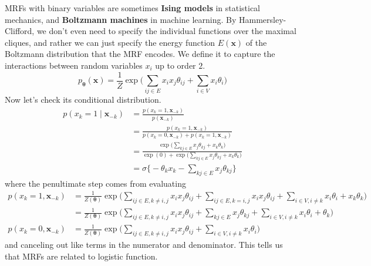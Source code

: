   \begin{definition}
    MRFs with binary variables are sometimes \textbf{Ising models} in statistical mechanics, and \textbf{Boltzmann machines} in machine learning. By Hammersley-Clifford, we don't even need to specify the individual functions over the maximal cliques, and rather we can just specify the energy function $E(\mathbf{x})$ of the Boltzmann distribution that the MRF encodes. We define it to capture the interactions between random variables $x_i$ up to order $2$. 
      \[p_{\boldsymbol{\theta}} (\mathbf{x}) = \frac{1}{Z} \exp \bigg( \sum_{ij \in E} x_i x_j \theta_{ij} + \sum_{i \in V} x_i \theta_i \bigg) \]
    Now let's check its conditional distribution. 
      \begin{align*}
        p(x_k = 1 \mid \mathbf{x}_{-k}) & = \frac{p(x_k = 1, \mathbf{x}_{-k})}{p(\mathbf{x}_{-k})} \\
                                        & = \frac{p(x_k = 1, \mathbf{x}_{-k})}{p(x_k = 0, \mathbf{x}_{-k}) + p(x_k = 1, \mathbf{x}_{-k})} \\
                                        & = \frac{\exp \Big( \sum_{k j \in E} x_j \theta_{kj} + x_k \theta_k \Big)}{\exp(0) + \exp \Big(\sum_{k j \in E} x_j \theta_{kj} + x_k \theta_k \Big)} \\
                                        & = \sigma \bigg\{ - \theta_k x_k - \sum_{k j \in E} x_j \theta_{k j} \bigg\} 
      \end{align*}
    where the penultimate step comes from evaluating 
      \begin{align*} 
        p(x_k = 1, \mathbf{x}_{-k}) & = \frac{1}{Z(\boldsymbol{\theta})} \exp \bigg( \sum_{ij \in E, k \neq i, j} x_i x_j \theta_{ij} + \sum_{i j \in E, k = i, j} x_i x_j \theta_{ij} + \sum_{i \in V, i \neq k} x_i \theta_i + x_k \theta_k \bigg) \\
                                    & =\frac{1}{Z(\boldsymbol{\theta})} \exp \bigg( \sum_{ij \in E, k \neq i, j} x_i x_j \theta_{ij} + \sum_{k j \in E} x_j \theta_{kj} + \sum_{i \in V, i \neq k} x_i \theta_i + \theta_k \bigg)  \\ 
        p(x_k = 0, \mathbf{x}_{-k}) & = \frac{1}{Z(\boldsymbol{\theta})} \exp \bigg( \sum_{ij \in E, k \neq i, j} x_i x_j \theta_{ij} + \sum_{i \in V, i \neq k} x_i \theta_i\bigg)  
      \end{align*}
    and canceling out like terms in the numerator and denominator. This tells us that MRFs are related to logistic function.  
  \end{definition}

